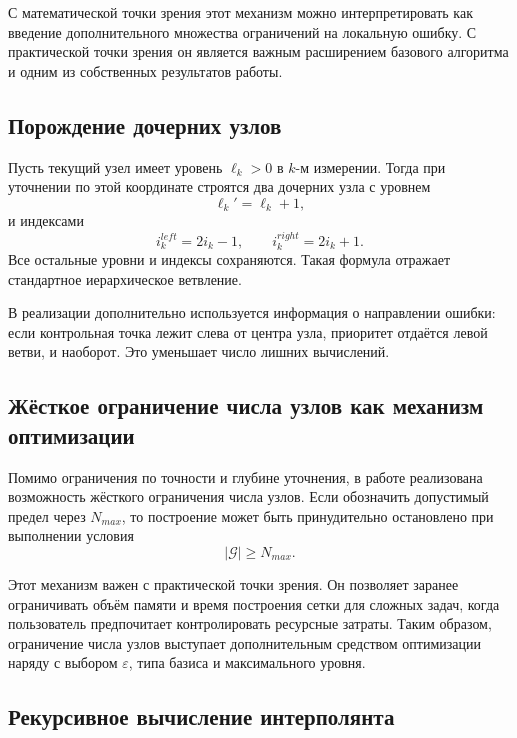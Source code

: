 С математической точки зрения этот механизм можно интерпретировать как введение дополнительного множества ограничений на локальную ошибку. С практической точки зрения он является важным расширением базового алгоритма и одним из собственных результатов работы.

\subsection{Порождение дочерних узлов}

Пусть текущий узел имеет уровень $\ell_k > 0$ в $k$-м измерении. Тогда при уточнении по этой координате строятся два дочерних узла с уровнем
\begin{equation}
    \ell_k' = \ell_k + 1,
\end{equation}
и индексами
\begin{equation}
    i_k^{left} = 2 i_k - 1, \qquad i_k^{right} = 2 i_k + 1.
\end{equation}
Все остальные уровни и индексы сохраняются. Такая формула отражает стандартное иерархическое ветвление.

В реализации дополнительно используется информация о направлении ошибки: если контрольная точка лежит слева от центра узла, приоритет отдаётся левой ветви, и наоборот. Это уменьшает число лишних вычислений.

\subsection{Жёсткое ограничение числа узлов как механизм оптимизации}

Помимо ограничения по точности и глубине уточнения, в работе реализована возможность жёсткого ограничения числа узлов. Если обозначить допустимый предел через $N_{max}$, то построение может быть принудительно остановлено при выполнении условия
\begin{equation}
    |\mathcal{G}| \geq N_{max}.
\end{equation}

Этот механизм важен с практической точки зрения. Он позволяет заранее ограничивать объём памяти и время построения сетки для сложных задач, когда пользователь предпочитает контролировать ресурсные затраты. Таким образом, ограничение числа узлов выступает дополнительным средством оптимизации наряду с выбором $\varepsilon$, типа базиса и максимального уровня.

\subsection{Рекурсивное вычисление интерполянта}

